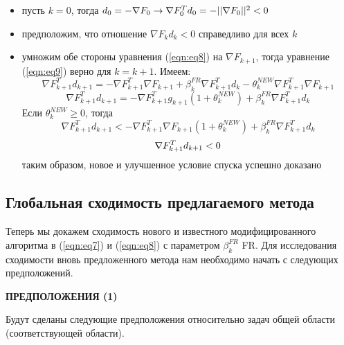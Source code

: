 \begin{itemize}
    \item пусть $k = 0$, тогда $d_{0}=-{\cal \nabla}F_{0}\to{\cal \nabla}F_{0}^{T}d_{0}=-\vert\vert{\cal \nabla}F_{0}\vert\vert^{2}<0$
    \item предположим, что отношение $\nabla F_{k}d_{k}<0$ справедливо для всех $k$
    \item умножим обе стороны уравнения (\ref{eqn:eq8}) на $\nabla F_{k+1}$, тогда уравнение
    (\ref{eqn:eq9}) верно для $k = k + 1$. Имеем:
    \begin{equation*}
        \nabla F_{k+1}^{T}d_{k+1}=-\nabla F_{k+1}^{T}\nabla F_{k+1}+\beta_{k}^{FR}\nabla F_{k+1}^{T}d_{k}-\theta_{k}^{N E W}\nabla F_{k+1}^{T}\nabla F_{k+1}
    \end{equation*}
    \begin{equation*}
        \nabla F_{k+1}^{T}d_{k+1}=-\nabla F_{k+1}^{T}g_{k+1}(1+\theta_{k}^{N E W})+\beta_{k}^{F R}\nabla F_{k+1}^{T}d_{k}
    \end{equation*}
    Если $\theta_{k}^{NEW} \ge 0$, тогда
    \begin{equation*}
        \nabla F_{k+1}^{T}d_{k+1}<-\nabla F_{k+1}^{T}\nabla F_{k+1}(1+\theta_{k}^{N E W})+\beta_{k}^{F R}\nabla F_{k+1}^{T}d_{k}
    \end{equation*}
    \begin{equation*}
        {\cal \nabla}F_{k+1}^{T}d_{k+1}<0
    \end{equation*}
    таким образом, новое и улучшенное условие спуска успешно доказано
\end{itemize}

\subsection{Глобальная сходимость предлагаемого метода}

Теперь мы докажем сходимость нового и известного модифицированного алгоритма в
(\ref{eqn:eq7}) и (\ref{eqn:eq8}) с параметром  $\beta_{k}^{FR}$  FR. Для
исследования сходимости вновь предложенного метода нам необходимо начать с
следующих предположений.

\noindent \textbf{ПРЕДПОЛОЖЕНИЯ (1)}

Будут сделаны следующие предположения относительно задач общей области
(соответствующей области).

